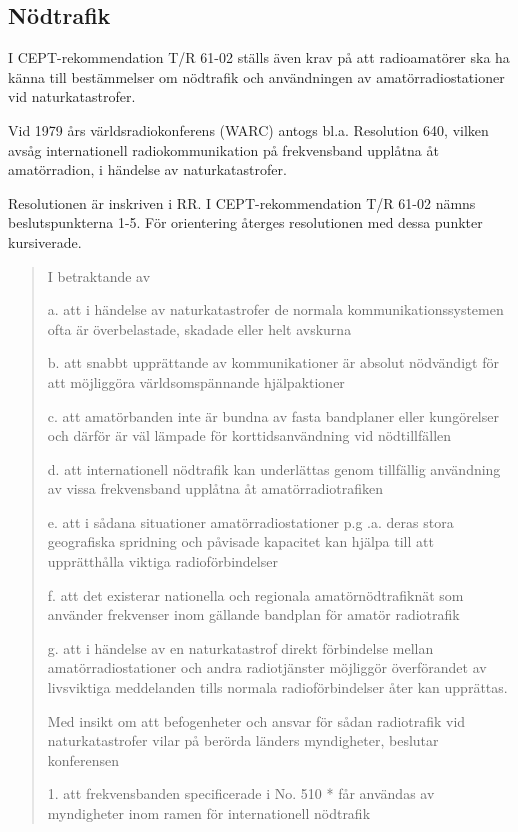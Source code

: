 \begin{rev-omarbetas}
\subsection{Nödtrafik}

I CEPT-rekommendation T/R 61-02 ställs även krav på att radioamatörer ska ha känna
till bestämmelser om nödtrafik och användningen av amatörradiostationer vid
naturkatastrofer.

Vid 1979 års världsradiokonferens (WARC) antogs bl.a. Resolution 640, vilken
avsåg internationell radiokommunikation på frekvensband upplåtna åt
amatörradion, i händelse av naturkatastrofer.

Resolutionen är inskriven i RR. I CEPT-rekommendation T/R 61-02 nämns
beslutspunkterna 1-5. För orientering återges resolutionen med dessa punkter
kursiverade.

\begin{quote}
I betraktande av

a. att i händelse av naturkatastrofer de normala kommunikationssystemen ofta är
överbelastade, skadade eller helt avskurna

b. att snabbt upprättande av kommunikationer är absolut nödvändigt för att
möjliggöra världsomspännande hjälpaktioner

c. att amatörbanden inte är bundna av fasta bandplaner eller kungörelser och
därför är väl lämpade för korttidsanvändning vid nödtillfällen

d. att internationell nödtrafik kan underlättas genom tillfällig användning av
vissa frekvensband upplåtna åt amatörradiotrafiken

e. att i sådana situationer amatörradiostationer p.g .a. deras stora geografiska
spridning och påvisade kapacitet kan hjälpa till att upprätthålla viktiga
radioförbindelser

f. att det existerar nationella och regionala amatörnödtrafiknät som använder
frekvenser inom gällande bandplan för amatör radiotrafik

g. att i händelse av en naturkatastrof direkt förbindelse mellan
amatörradiostationer och andra radiotjänster möjliggör överförandet av
livsviktiga meddelanden tills normala radioförbindelser åter kan upprättas.

Med
insikt om att befogenheter och ansvar för sådan radiotrafik vid naturkatastrofer
vilar på berörda länders myndigheter, beslutar konferensen

1. att frekvensbanden specificerade i No. 510 * får användas av myndigheter
inom ramen för internationell nödtrafik


\end{quote}
\end{rev-omarbetas}
